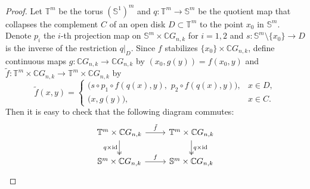 \documentclass{amsart}
\begin{document}
	
	\begin{proof}
		Let $\mathbb T^m$ be the torus $(\mathbb S^1)^m$ and
		$q:\mathbb T^m\to \mathbb S^m$ be the quotient map that collapses the complement $C$ of an open disk $D\subset \mathbb T^m$ to the point $x_0$ in $\mathbb{S}^m$.  Denote $p_i$ the $i$-th projection map on $\mathbb S^m\times \mathbb CG_{n,k}$ for $i=1,2$ and %
$s:\mathbb S^m\setminus\{x_0\}\to D$ is the %
inverse of the restriction $q|_D$.
		Since $f$ stabilizes $\{x_0\}\times \mathbb{C}G_{n,k}$, define continuous maps
		$g:\mathbb{C}G_{n,k}\to \mathbb{C}G_{n,k}$ by $(x_0,g(y)) = f(x_0,y)$ and $\tilde f:\mathbb T^m\times \mathbb{C}G_{n,k}\to \mathbb T^m\times \mathbb{C}G_{n,k}$ by
		\[
		\tilde f(x,y)=
		\begin{cases}
			\big(s\circ p_1\circ f(q(x),y),\,\,p_2\circ f(q(x),y)\big), & x\in D,\\[2pt]
			\big(x,g(y)\big), & x\in C.
		\end{cases}
		\]
		Then it is easy to check that the following diagram %
commutes:
		\[ \begin{tikzcd}
			{\mathbb T^m\times \mathbb{C}G_{n,k}} & {\mathbb T^m\times \mathbb{C}G_{n,k}} \\
			{\mathbb S^m\times \mathbb{C}G_{n,k}} & {\mathbb S^m\times \mathbb{C}G_{n,k}}
			\arrow["{\tilde f}", from=1-1, to=1-2]
			\arrow["{q\times \mathrm{id}}"', two heads, from=1-1, to=2-1]
			\arrow["{q\times \mathrm{id}}", two heads, from=1-2, to=2-2]
			\arrow["f", from=2-1, to=2-2]
		\end{tikzcd}
		\]
		

\end{proof}
\end{document}
